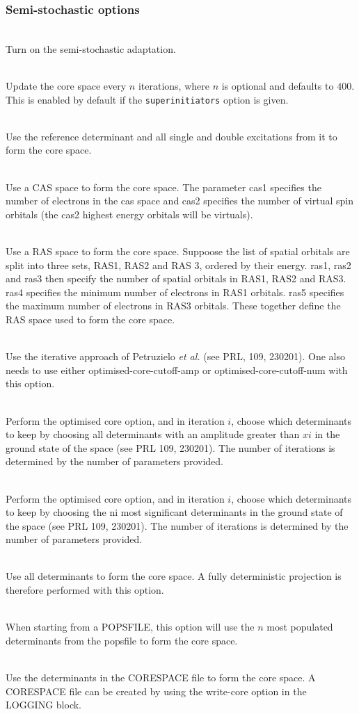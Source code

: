 \documentclass[a4paper,notitlepage]{scrreprt}
\newcommand\codeitem[1]{\needspace{1.5\baselineskip}\item[\textnormal{\ttfamily #1 \nopagebreak}] \hfill \\ \nopagebreak}
\begin{document}
  \subsubsection{Semi-stochastic options}
  \begin{description}
    \codeitem{semi-stochastic}
    Turn on the semi-stochastic adaptation.
    \codeitem{dynamic-core $n$}
    Update the core space every $n$ iterations, where $n$ is optional and
    defaults to $400$. This is enabled by default if the
    \texttt{superinitiators} option is given.
    \codeitem{doubles-core}
    Use the reference determinant and all single and double excitations
    from it to form the core space.
    \codeitem{cas-core cas1 cas2}
    Use a CAS space to form the core space. The parameter cas1 specifies
    the number of electrons in the cas space and cas2 specifies the
    number of virtual spin orbitals (the cas2 highest energy orbitals
    will be virtuals).
    \codeitem{ras-core ras1 ras2 ras3 ras4 ras5}
    Use a RAS space to form the core space. Suppoose the list of spatial
    orbitals are split into three sets, RAS1, RAS2 and RAS 3, ordered
    by their energy. ras1, ras2 and ras3 then specify the number of
    spatial orbitals in RAS1, RAS2 and RAS3. ras4 specifies the minimum
    number of electrons in RAS1 orbitals. ras5 specifies the maximum
    number of electrons in RAS3 orbitals. These together define the RAS
    space used to form the core space.
    \codeitem{optimised-core}
    Use the iterative approach of Petruzielo \emph{et al.} (see PRL,
    109, 230201). One also needs to use either optimised-core-cutoff-amp
    or optimised-core-cutoff-num with this option.
    \codeitem{optimised-core-cutoff-amp $x1$, $x2$, $x3$...}
    Perform the optimised core option, and in iteration $i$, choose
    which determinants to keep by choosing all determinants with an
    amplitude greater than $xi$ in the ground state of the space (see
    PRL 109, 230201). The number of iterations is determined by the
    number of parameters provided.
    \codeitem{optimised-core-cutoff-num $n1$, $n2$, $n3$...}
    Perform the optimised core option, and in iteration $i$, choose
    which determinants to keep by choosing the ni most significant
    determinants in the ground state of the space (see PRL 109, 230201).
    The number of iterations is determined by the number of parameters
    provided.
    \codeitem{fci-core}
    Use all determinants to form the core space. A fully deterministic
    projection is therefore performed with this option.
    \codeitem{pops-core $n$}
    When starting from a POPSFILE, this option will use the $n$ most
    populated determinants from the popsfile to form the core space.
    \codeitem{read-core}
    Use the determinants in the CORESPACE file to form the core space.
    A CORESPACE file can be created by using the write-core option in
    the LOGGING block.
    \end{description}
\end{document}

